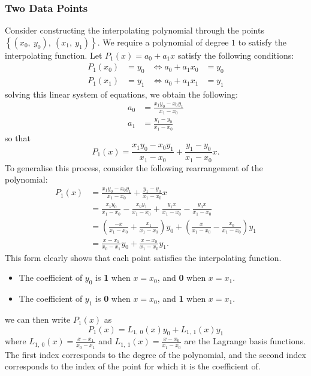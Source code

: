 \documentclass{article}
\begin{document}
\subsubsection{Two Data Points}
Consider constructing the interpolating polynomial through the points
\(\left\{ \left( x_0,\: y_0 \right),\: \left( x_1,\: y_1 \right)
\right\}\). We require a polynomial of degree \(1\) to satisfy the
interpolating function. Let \(P_1\left( x \right) = a_0 + a_1 x\)
satisfy the following conditions:
\begin{align*}
    P_1\left( x_0 \right) & = y_0 & \iff a_0 + a_1 x_0 & = y_0 \\
    P_1\left( x_1 \right) & = y_1 & \iff a_0 + a_1 x_1 & = y_1
\end{align*}
solving this linear system of equations, we obtain the following:
\begin{align*}
    a_0 & = \frac{x_1 y_0 - x_0 y_1}{x_1 - x_0} \\
    a_1 & = \frac{y_1 - y_0}{x_1 - x_0}
\end{align*}
so that
\begin{equation*}
    P_1\left( x \right) = \frac{x_1 y_0 - x_0 y_1}{x_1 - x_0} + \frac{y_1 - y_0}{x_1 - x_0} x.
\end{equation*}
To generalise this process, consider the following rearrangement of the
polynomial:
\begin{align*}
    P_1\left( x \right) & = \frac{x_1 y_0 - x_0 y_1}{x_1 - x_0} + \frac{y_1 - y_0}{x_1 - x_0} x                                                              \\
                        & = \frac{x_1 y_0}{x_1 - x_0} - \frac{x_0 y_1}{x_1 - x_0} + \frac{y_1 x}{x_1 - x_0} - \frac{y_0 x}{x_1 - x_0}                        \\
                        & = \left( \frac{-x}{x_1 - x_0} + \frac{x_1}{x_1 - x_0} \right) y_0 + \left( \frac{x}{x_1 - x_0} - \frac{x_0}{x_1 - x_0} \right) y_1 \\
                        & = \frac{x - x_1}{x_0 - x_1} y_0 + \frac{x - x_0}{x_1 - x_0} y_1.
\end{align*}
This form clearly shows that each point satisfies the interpolating
function.
\begin{itemize}
    \item The coefficient of \(y_0\) is \textbf{1} when \(x = x_0\),
          and \textbf{0} when \(x = x_1\).
    \item The coefficient of \(y_1\) is \textbf{0} when \(x = x_0\),
          and \textbf{1} when \(x = x_1\).
\end{itemize}
we can then write \(P_1\left( x \right)\) as
\begin{equation*}
    P_1\left( x \right) = L_{1,\: 0}\left( x \right) y_0 + L_{1,\: 1}\left( x \right) y_1
\end{equation*}
where \(L_{1,\: 0}\left( x \right) = \frac{x - x_1}{x_0 - x_1}\) and
\(L_{1,\: 1}\left( x \right) = \frac{x - x_0}{x_1 - x_0}\) are the
Lagrange basis functions. The first index corresponds to the degree of
the polynomial, and the second index corresponds to the index of the
point for which it is the coefficient of.
\end{document}
